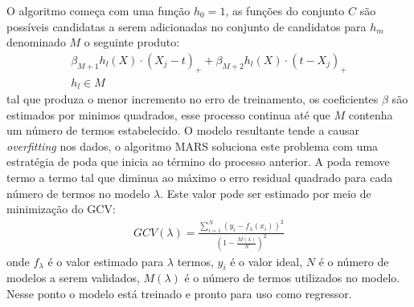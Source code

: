 O algoritmo começa com uma função \(h_{0} = 1\), as funções do conjunto \(C\) são possíveis candidatas a serem adicionadas no conjunto de candidatos para \(h_{m}\) denominado \(M\) o seguinte produto:
\begin{align}
\beta_{M+1}h_{l}(X) \cdot (X_{j}-t)_{+} + \beta_{M+2}h_{l}(X) \cdot (t-X_{j})_{+} \\
\nonumber h_{l} \in M
\end{align}
tal que produza o menor incremento no erro de treinamento, os coeficientes \(\beta\) são estimados por minimos quadrados, esse processo continua até que \(M\) contenha um número de termos estabelecido. O modelo resultante tende a causar \emph{overfitting} nos dados, o algoritmo MARS soluciona este problema com uma estratégia de poda que inicia ao término  do processo anterior. A poda remove termo a termo tal que diminua ao máximo o erro residual quadrado para cada número de termos no modelo \(\lambda\). Este valor pode ser estimado por meio de minimização do GCV:
\begin{align}
GCV(\lambda) = \frac{\sum\limits_{i=1}^{N}(y_{i} - f_{\lambda}(x_{i}))^{2}}{(1-\frac{M(\lambda)}{N})^{2}}
\end{align}
onde \(f_{\lambda}\) é o valor estimado para \(\lambda\) termos, \(y_{i}\) é o valor ideal, \(N\) é o número de modelos a serem validados, \(M(\lambda)\) é o número de termos utilizados no modelo. Nesse ponto o modelo está treinado e pronto para uso como regressor.

